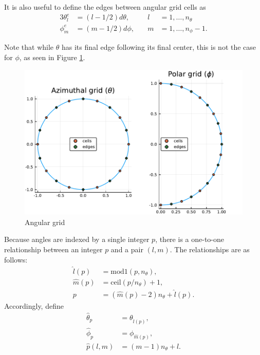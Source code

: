 \documentclass[ms,cpyr,lof,lot]{uathesis}
\newcommand{\ceil}{\mbox{ceil}}
\begin{document}
It is also useful to define the edges between angular grid cells as
\begin{alignat}{3}
  \theta_l^e &= (l-1/2) d\theta, &\quad l&=1,\ldots,n_\theta \\
  \phi_m^e &= (m-1/2) d\phi, &\quad m&=1,\ldots,n_\phi-1.
\end{alignat}

Note that while $\theta$ has its final edge following its final center, this is
not the case for $\phi$, as seen in Figure \ref{fig:angular_grid_plots}.

\begin{figure}[h]
  \centering
  \includegraphics[width=.75\linewidth]{angular_grid_plots}
  \caption{Angular grid}
  \label{fig:angular_grid_plots}
\end{figure}

Because angles are indexed by a single integer $p$, there is a one-to-one relationship between
an integer $p$ and a pair $(l,m)$.
The relationships are as follows:
\begin{align*}
  \hat{l}(p) &= \mbox{mod1}(p, n_\theta), \\
  \hat{m}(p) &= \ceil(p/n_\theta) + 1, \\
  p &= \left( \hat{m}(p)-2\right)n_\theta + \hat{l}(p).
\end{align*}
Accordingly, define
\begin{align*}
  \hat{\theta}_p &= \theta_{\hat{l}(p)}, \\
  \hat{\phi}_p &= \phi_{\hat{m}(p)}, \\
  \hat{p}(l,m) &= (m-1)n_\theta + l.
\end{align*}
\end{document}
